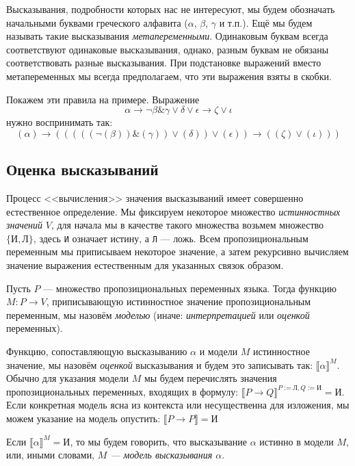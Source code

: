 Высказывания, подробности
которых нас не интересуют, мы будем обозначать начальными буквами 
греческого алфавита
($\alpha$, $\beta$, $\gamma$ и т.п.). 
Ещё мы будем называть такие
высказывания \emph{метапеременными}.
Одинаковым буквам всегда соответствуют
одинаковые высказывания, однако, разным буквам не обязаны соответствовать
разные высказывания. 
При подстановке выражений вместо метапеременных мы всегда предполагаем,
что эти выражения взяты в скобки.

Покажем эти правила на примере. Выражение
$$\alpha \rightarrow \neg \beta \& \gamma \vee \delta \vee \epsilon \rightarrow \zeta\vee\iota$$
нужно воспринимать так:
$$(\alpha) \rightarrow \left(((((\neg (\beta)) \& (\gamma)) \vee (\delta)) \vee (\epsilon)) \rightarrow ((\zeta)\vee(\iota))\right)$$

\subsection{Оценка высказываний}

Процесс <<вычисления>> значения высказываний имеет совершенно
естественное определение. Мы фиксируем некоторое множество
\emph{истинностных значений} $V$, для начала мы в качестве такого множества возьмем 
множество $\{\texttt{И}, \texttt{Л}\}$, здесь \texttt{И} означает истину, а
\texttt{Л} --- ложь. Всем пропозициональным переменным мы приписываем некоторое
значение, а затем рекурсивно вычисляем значение выражения естественным для указанных
связок образом.

Пусть $P$ --- множество пропозициональных переменных языка.
Тогда функцию $M: P \rightarrow V$, приписывающую истинностное 
значение пропозициональным переменным, мы назовём \emph{моделью} 
(иначе: \emph{интерпретацией} или \emph{оценкой} переменных). 

Функцию, сопоставляющую высказыванию $\alpha$ и модели $M$
истинностное значение, мы назовём \emph{оценкой} высказывания и
будем это записывать так: $\llbracket \alpha \rrbracket ^ M$.
Обычно для указания модели $M$ мы будем перечислять значения
пропозициональных переменных, входящих в формулу:
$\llbracket P \rightarrow Q \rrbracket ^ {P:=\texttt{Л}, Q:=\texttt{И}} = \texttt{И}$.
Если конкретная модель ясна из контекста или несущественна для изложения,
мы можем указание на модель опустить: $\llbracket P \rightarrow P \rrbracket = \texttt{И}$

Если $\llbracket \alpha \rrbracket ^ M = \texttt{И}$, то мы будем 
говорить, что высказывание $\alpha$ истинно в модели $M$, или, иными словами,
\emph{$M$ --- модель высказывания $\alpha$}.

